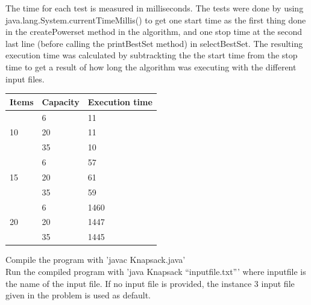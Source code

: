 \documentclass{inc/mas}
\begin{document}
The time for each test is measured in milliseconds. The tests were done by using java.lang.System.currentTimeMillis() to get one start time as the first thing done in the createPowerset method in the algorithm, and one stop time at the second last line (before calling the printBestSet method) in selectBestSet. The resulting execution time was calculated by subtrackting the the start time from the stop time to get a result of how long the algorithm was executing with the different input files.\\

\begin{tabular}{|l|l|l|} \hline
Items &Capacity &Execution time\\ \hline
\multirow{3}{*}{10} & 6 & 11 \\
& 20 & 11 \\
& 35 & 10 \\ \hline
\multirow{3}{*}{15} & 6 & 57 \\
& 20 & 61 \\
& 35 & 59 \\ \hline
\multirow{3}{*}{20} & 6 & 1460 \\
& 20 & 1447 \\
& 35 & 1445 \\ \hline
\end{tabular}

\noindent Compile the program with 'javac Knapsack.java'\\ 
\noindent Run the compiled program with 'java Knapsack ``inputfile.txt''' where inputfile is the name of the input file. If no input file is provided, the instance 3 input file given in the problem is used as default. 




%
\end{document}
